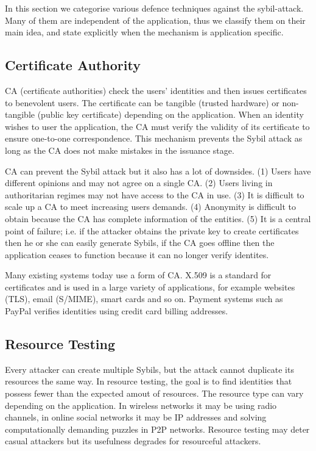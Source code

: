 In this section we categorise various defence techniques against the
sybil-attack. Many of them are independent of the application, thus we classify
them on their main idea, and state explicitly when the mechanism is application
specific.

\subsection{Certificate Authority}\label{sec:cert-authority}

CA (certificate authorities) check the users' identities and then issues
certificates to benevolent users. The certificate can be tangible (trusted
hardware\cite{newsome2004sybil}) or non-tangible (public key certificate)
depending on the application. When an identity wishes to user the application,
the CA must verify the validity of its certificate to ensure one-to-one
correspondence. This mechanism prevents the Sybil attack as long as the CA does
not make mistakes in the issuance stage.

CA can prevent the Sybil attack but it also has a lot of downsides. (1) Users
have different opinions and may not agree on a single CA. (2) Users living in
authoritarian regimes may not have access to the CA in use. (3) It is difficult
to scale up a CA to meet increasing users demands. (4) Anonymity is difficult to
obtain because the CA has complete information of the entities. (5) It is a
central point of failure; i.e. if the attacker obtains the private key to create
certificates then he or she can easily generate Sybils, if the CA goes offline
then the application ceases to function because it can no longer verify
identites.

Many existing systems today use a form of CA.
X.509 is a standard for certificates and is used in a large variety of
applications, for example websites (TLS), email (S/MIME), smart cards and so on.
Payment systems such as PayPal verifies identities using credit card billing addresses.

\subsection{Resource Testing}
Every attacker can create multiple Sybils, but the attack cannot duplicate its
resources the same way. In resource testing, the goal is to find identities that
possess fewer than the expected amout of resources. The resource type can vary
depending on the application. In wireless networks it may be using radio
channels\cite{newsome2004sybil}, in online social networks it may be IP
addresses\cite{freedman2002tarzan} and solving computationally demanding puzzles
in P2P networks\cite{aspnes2005exposing}. Resource testing may deter casual
attackers but its usefulness degrades for resourceful attackers.

